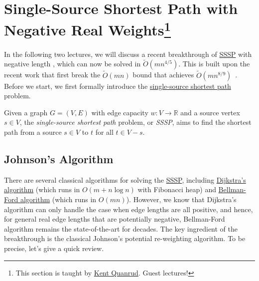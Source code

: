 \section[Single-Source Shortest Path with Negative Real Weights]{Single-Source Shortest Path with Negative Real Weights\protect\footnote{This section is taught by \href{https://kentquanrud.com/}{Kent Quanrud}. Guest lectures!}}
In the following two lectures, we will discuss a recent breakthrough of \hyperref[prb:SSSP]{SSSP} with negative length \cite{huang2024fastersinglesourceshortestpaths}, which can now be solved in \(\widetilde{O} (mn^{4 / 5})\). This is built upon the recent work that first break the \(\widetilde{O} (mn)\) bound that achieves \(\widetilde{O} (mn^{8 / 9})\)~\cite{fineman2024single}. Before we start, we first formally introduce the \hyperref[prb:SSSP]{single-source shortest path} problem.

\begin{problem}\label{prb:SSSP}
Given a graph \(G = (V, E)\) with edge capacity \(w\colon V \to \mathbb{R} \) and a source vertex \(s \in V\), the \emph{single-source shortest path} problem, or \emph{SSSP}, aims to find the shortest path from a source \(s \in V\) to \(t\) for all \(t \in V - s\).
\end{problem}

\subsection{Johnson's Algorithm}
There are several classical algorithms for solving the \hyperref[prb:SSSP]{SSSP}, including \href{https://en.wikipedia.org/wiki/Dijkstra%27s_algorithm}{Dijkstra's algorithm} (which runs in \(O(m + n \log n)\) with Fibonacci heap) and \href{https://en.wikipedia.org/wiki/Bellman%E2%80%93Ford_algorithm}{Bellman-Ford algorithm} (which runs in \(O(mn)\)). However, we know that Dijkstra's algorithm can only handle the case when edge lengths are all positive, and hence, for general real edge lengths that are potentially negative, Bellman-Ford algorithm remains the state-of-the-art for decades. The key ingredient of the breakthrough is the classical Johnson's potential re-weighting algorithm. To be precise, let's give a quick review.

